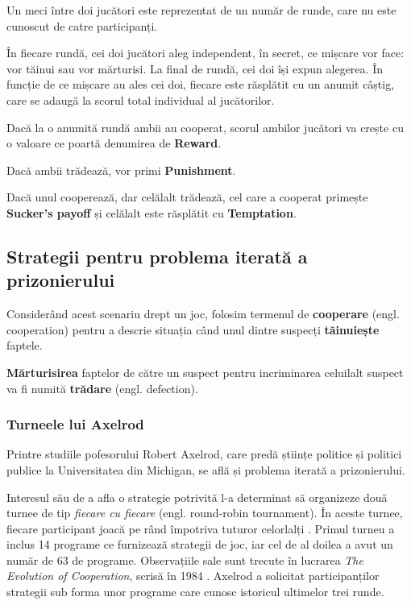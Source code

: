 Un meci între doi jucători este reprezentat de un număr de runde, care nu este cunoscut de catre participanți.

În fiecare rundă, cei doi jucători aleg independent, în secret, ce mișcare vor face: vor tăinui sau vor mărturisi. La final de rundă, cei doi își expun alegerea. În funcție de ce mișcare au ales cei doi, fiecare este răsplătit cu un anumit câștig, care se adaugă la scorul total individual al jucătorilor. 

Dacă la o anumită rundă ambii au cooperat, scorul ambilor jucători va crește cu o valoare ce poartă denumirea de \textbf{Reward}. 

Dacă ambii trădează, vor primi \textbf{Punishment}. 

Dacă unul cooperează, dar celălalt trădează, cel care a cooperat primește \textbf{Sucker's payoff} și celălalt este răsplătit cu \textbf{Temptation}. 

\subsection {Strategii pentru problema iterată a prizonierului}

Considerând acest scenariu drept un joc, folosim termenul de \textbf{cooperare} (engl. cooperation) pentru a descrie situația când unul dintre suspecți \textbf{tăinuiește} faptele. 

\textbf{Mărturisirea} faptelor de către un suspect pentru incriminarea celuilalt suspect va fi numită \textbf{trădare} (engl. defection). 

\subsubsection{Turneele lui Axelrod}

Printre studiile pofesorului Robert Axelrod, care predă științe politice și politici publice la Universitatea din Michigan, se află și problema iterată a prizonierului.

Interesul său de a afla o strategie potrivită l-a determinat să organizeze două turnee de tip \textit{fiecare cu fiecare} (engl. round-robin tournament). În aceste turnee, fiecare participant joacă pe rând împotriva tuturor celorlalți \cite{round_robin_dictionary}. Primul turneu a inclus 14 programe ce furnizează strategii de joc, iar cel de al doilea a avut un număr de 63 de programe. Observațiile sale sunt trecute în lucrarea \textit{The Evolution of Cooperation}, scrisă în 1984 \cite{article_by_melanie_mitchell}. Axelrod a solicitat participanților strategii sub forma unor programe care cunosc istoricul ultimelor trei runde.


